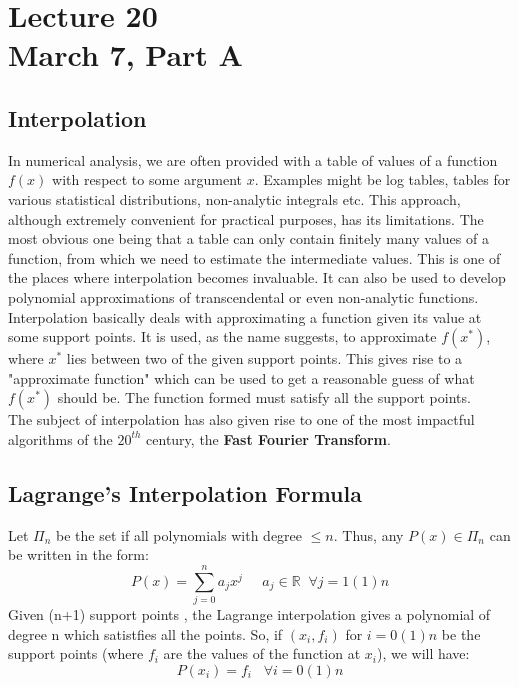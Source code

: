 \chapter*{Lecture 20\\March 7, Part A}
\setcounter{chapter}{20}


\setcounter{section}{0}

\section{Interpolation}

In numerical analysis, we are often provided with a table of values of a function $f(x)$ with respect to some argument $x$. Examples might be log tables, tables for various statistical distributions, non-analytic integrals etc. This approach, although extremely convenient for practical purposes, has its limitations. The most obvious one being that a table can only contain finitely many values of a function, from which we need to estimate the intermediate values. This is one of the places where interpolation becomes invaluable. It can also be used to develop polynomial approximations of transcendental or even non-analytic functions.\\
Interpolation basically deals with approximating a function given its value at some support points. It is used, as the name suggests, to approximate $f(x^*)$, where $x^*$ lies between two of the given support points. This gives rise to a "approximate function" which can be used to get a reasonable guess of what $f(x^*)$ should be. The function formed must satisfy all the support points.\\
The subject of interpolation has also given rise to one of the most impactful algorithms of the $20^{th}$ century, the \textbf{Fast Fourier Transform}.

\section{Lagrange's Interpolation Formula}

Let $\Pi_n$ be the set if all polynomials with degree $\leq n$. Thus, any $P(x) \in \Pi_n$ can be written in the form:
$$P(x) = \sum_{j = 0}^n a_j x^j\;\;\;\;\;a_j \in \mathbb{R}\;\;\forall j= 1(1)n$$
Given (n+1) support points , the Lagrange interpolation gives a polynomial of degree n which satistfies all the points. So, if $(x_i,f_i)$ for $i = 0(1)n$ be the support points (where $f_i$ are the values of the function at $x_i$), we will have:
$$P(x_i) = f_i    \;\;\; \forall i = 0(1)n$$

